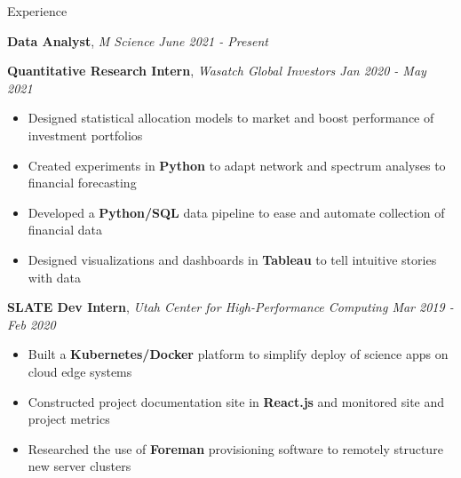 \documentclass{resume/resume}
\begin{document}
\begin{rSection}{Experience}

    {\bf Data Analyst}, {\em M Science \hfill June 2021 - Present}

    {\bf Quantitative Research Intern}, {\em Wasatch Global Investors \hfill Jan 2020 - May 2021}
    \vspace{-6pt}
    \begin{itemize}[nosep]
        \item Designed statistical allocation models to market and boost performance of investment portfolios
        \item Created experiments in {\bf Python} to adapt network and spectrum analyses to financial forecasting
        \item Developed a {\bf Python/SQL} data pipeline to ease and automate collection of financial data
        \item Designed visualizations and dashboards in {\bf Tableau} to tell intuitive stories with data
    \end{itemize}

    {\bf SLATE Dev Intern}, {\em Utah Center for High-Performance Computing \hfill Mar 2019 - Feb 2020}
    \vspace{-6pt}
    \begin{itemize}[nosep]
        \item Built a {\bf Kubernetes/Docker} platform to simplify deploy of science apps on cloud edge systems
        \item Constructed project documentation site in {\bf React.js} and monitored site and project metrics
        \item Researched the use of {\bf Foreman} provisioning software to remotely structure new server clusters
    \end{itemize}
    

\end{rSection}
\end{document}
